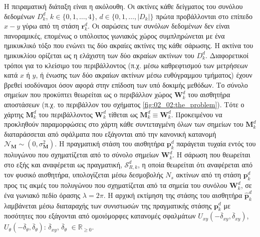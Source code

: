 Η πειραματική διάταξη είναι η ακόλουθη. Οι ακτίνες κάθε δείγματος του συνόλου
δεδομένων $D_k^d$, $k \in \{0,1,\dots,4\}$, $d \in \{0,1,\dots,|D_k|\}$ πρώτα
προβάλλονται στο επίπεδο $x-y$ γύρω από τη στάση $\bm{r}_k^d$. Οι σαρώσεις των
συνόλων δεδομένων δεν είναι πανοραμικές, επομένως ο υπόλοιπος γωνιακός χώρος
συμπληρώνεται με ένα ημικυκλικό τόξο που ενώνει τις δύο ακραίες ακτίνες της
κάθε σάρωσης. Η ακτίνα του ημικυκλίου ορίζεται ως η ελάχιστη των δύο ακραίων
ακτίνων του $D_k^d$. Διαφορετικοί τρόποι για το κλείσιμο του περιβάλλοντος
(π.χ.  μέσω καθρεφτισμού των μετρήσεων κατά $x$ ή $y$, ή ένωσης των δύο ακραίων
ακτίνων μέσω ευθύγραμμου τμήματος) έχουν βρεθεί ισοδύναμοι όσον αφορά στην
επίδοση των υπό δοκιμής μεθόδων. Το σύνολο σημείων που προκύπτει θεωρείται ως ο
περιβάλλον χώρος $\bm{W}_k^d$ του αισθητήρα αποστάσεων (π.χ.  το περιβάλλον του
σχήματος \ref{fig:02_02:the_problem}). Τότε ο χάρτης $\bm{M}_k^d$ του
περιβάλλοντος $\bm{W}_k^d$ τίθεται ως $\bm{M}_k^d \equiv \bm{W}_k^d$.
Προκειμένου να προκληθούν παραμορφώσεις στο χάρτη κάθε συντεταγμένη όλων των
σημείων του $\bm{M}_k^d$ διαταράσσεται από σφάλματα που εξάγονται από την
κανονική κατανομή $\mathcal{N}_{\bm{M}} \sim (0, \sigma_{\bm{M}}^2)$.  Η
πραγματική στάση του αισθητήρα $\bm{p}_k^d$ παράγεται τυχαία εντός του
πολυγώνου που σχηματίζεται από το σύνολο σημείων $\bm{W}_k^d$.  Η σάρωση που
θεωρείται στο εξής και αναφέρεται ως πραγματική, $\mathcal{S}_{R,k}^d$, η οποία
θεωρείται ότι αναφέρεται από τον φυσικό αισθητήρα, υπολογίζεται μέσω δεσμοβολής
$N_s$ ακτίνων από τη στάση $\bm{p}_k^d$ προς τις ακμές του πολυγώνου που
σχηματίζεται από τα σημεία του συνόλου $\bm{W}_k^d$, σε ένα γωνιακό πεδίο
όρασης $\lambda = 2\pi$. Η αρχική εκτίμηση της στάσης του αισθητήρα
$\hat{\bm{p}}_k^d$ λαμβάνεται μέσω διαταραχής των συνιστωσών της πραγματικής
στάσης $\bm{p}^d_k$ με ποσότητες που εξάγονται από ομοιόμορφες κατανομές
σφαλμάτων $U_{xy}(-\overline{\delta}_{xy}, \overline{\delta}_{xy})$,
$U_{\theta}(-\overline{\delta}_{\theta}, \overline{\delta}_{\theta})$:
$\overline{\delta}_{xy}$, $\overline{\delta}_\theta$ $\in \mathbb{R}_{\geq 0}$.


